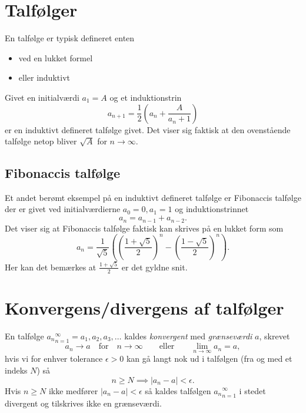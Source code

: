 
\section{Talfølger}
En talfølge er typisk defineret enten
\begin{itemize}
  \item ved en lukket formel
  \item eller induktivt
\end{itemize}

\begin{eks} 
  Givet en initialværdi $a_1 = A$ og et induktionstrin
  \[ 
  a_{n+1} = \frac{1}{2}\left( a_n + \frac{A}{a_n+1} \right)
  \]
  er en induktivt defineret talfølge givet. Det viser sig faktisk at den ovenstående talfølge netop bliver $\sqrt{A}$ for $n \to \infty$.
\end{eks}

\subsection{Fibonaccis talfølge}
Et andet berømt eksempel på en induktivt defineret talfølge er Fibonaccis talfølge der er givet ved initialværdierne $a_0 = 0, a_1 = 1$ og induktionstrinnet
\[ 
a_n = a_{n-1} + a_{n-2}
.\]
Det viser sig at Fibonaccis talfølge faktisk kan skrives på en lukket form som
\[ 
a_n = \frac{1}{\sqrt{5}} \left( \left( \frac{1 + \sqrt{5}}{2} \right)^{n} - \left( \frac{1 - \sqrt{5}}{2} \right)^{n} \right)
.\]
Her kan det bemærkes at $\frac{1 + \sqrt{5}}{2}$ er det gyldne snit.

\section{Konvergens/divergens af talfølger} \label{afs:konv}
\begin{definition} 
  En talfølge ${a_n}_{n = 1}^{\infty} = a_1, a_2, a_3,\ldots$ kaldes \textit{konvergent} med \textit{grænseværdi} $a$, skrevet
  \[ 
  a_n \to a \quad \text{for} \quad n\to \infty \qquad \text{eller} \qquad \lim_{n \to \infty } a_n = a
  ,\]
  hvis vi for enhver tolerance $\epsilon > 0$ kan gå langt nok ud i talfølgen (fra og med et indeks $N$) så
  \[ 
  n \geq N \implies |a_n - a| < \epsilon
  .\]
  Hvis $n \geq N$ ikke medfører $|a_n - a| <\epsilon$ så kaldes talfølgen ${a_n}_{n = 1}^{\infty}$ i stedet divergent og tilskrives ikke en grænseværdi.
\end{definition}

